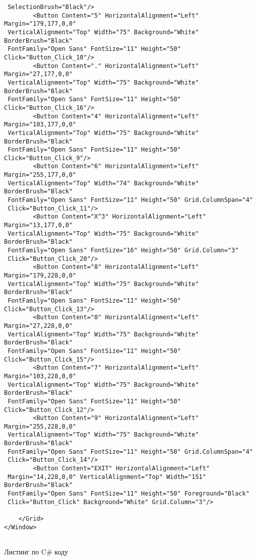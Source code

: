 {\begin{verbatim}
 SelectionBrush="Black"/>
        <Button Content="5" HorizontalAlignment="Left" Margin="179,177,0,0"
 VerticalAlignment="Top" Width="75" Background="White" BorderBrush="Black"
 FontFamily="Open Sans" FontSize="11" Height="50" Click="Button_Click_10"/>
        <Button Content="." HorizontalAlignment="Left" Margin="27,177,0,0"
 VerticalAlignment="Top" Width="75" Background="White" BorderBrush="Black"
 FontFamily="Open Sans" FontSize="11" Height="50" Click="Button_Click_16"/>
        <Button Content="4" HorizontalAlignment="Left" Margin="103,177,0,0"
 VerticalAlignment="Top" Width="75" Background="White" BorderBrush="Black"
 FontFamily="Open Sans" FontSize="11" Height="50" Click="Button_Click_9"/>
        <Button Content="6" HorizontalAlignment="Left" Margin="255,177,0,0"
 VerticalAlignment="Top" Width="74" Background="White" BorderBrush="Black"
 FontFamily="Open Sans" FontSize="11" Height="50" Grid.ColumnSpan="4"
 Click="Button_Click_11"/>
        <Button Content="X^3" HorizontalAlignment="Left" Margin="13,177,0,0"
 VerticalAlignment="Top" Width="75" Background="White" BorderBrush="Black"
 FontFamily="Open Sans" FontSize="16" Height="50" Grid.Column="3"
 Click="Button_Click_20"/>
        <Button Content="8" HorizontalAlignment="Left" Margin="179,228,0,0"
 VerticalAlignment="Top" Width="75" Background="White" BorderBrush="Black"
 FontFamily="Open Sans" FontSize="11" Height="50" Click="Button_Click_13"/>
        <Button Content="0" HorizontalAlignment="Left" Margin="27,228,0,0"
 VerticalAlignment="Top" Width="75" Background="White" BorderBrush="Black"
 FontFamily="Open Sans" FontSize="11" Height="50" Click="Button_Click_15"/>
        <Button Content="7" HorizontalAlignment="Left" Margin="103,228,0,0"
 VerticalAlignment="Top" Width="75" Background="White" BorderBrush="Black"
 FontFamily="Open Sans" FontSize="11" Height="50" Click="Button_Click_12"/>
        <Button Content="9" HorizontalAlignment="Left" Margin="255,228,0,0"
 VerticalAlignment="Top" Width="75" Background="White" BorderBrush="Black"
 FontFamily="Open Sans" FontSize="11" Height="50" Grid.ColumnSpan="4"
 Click="Button_Click_14"/>
        <Button Content="EXIT" HorizontalAlignment="Left"
 Margin="14,228,0,0" VerticalAlignment="Top" Width="151" BorderBrush="Black"
 FontFamily="Open Sans" FontSize="11" Height="50" Foreground="Black"
 Click="Button_Click" Background="White" Grid.Column="3"/>

    </Grid>
</Window>


\end{verbatim}
Листинг по C\# коду
\begin{verbatim}



\end{verbatim}}
